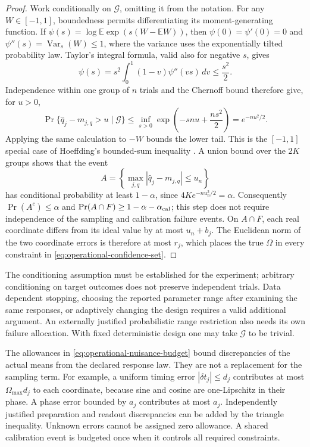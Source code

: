 \documentclass[11pt]{article}
\theoremstyle{definition}
\begin{document}
\begin{proof}
Work conditionally on $\mathcal G$, omitting it from the notation. For any
$W\in[-1,1]$, boundedness permits differentiating its moment-generating
function. If
$\psi(s)=\log\mathbb E\exp(s(W-\mathbb EW))$, then
$\psi(0)=\psi'(0)=0$ and
$\psi''(s)=\operatorname{Var}_s(W)\le1$, where the variance uses the
exponentially tilted probability law. Taylor's integral formula, valid also
for negative $s$, gives
\[
 \psi(s)=s^2\int_0^1(1-v)\psi''(vs)\,dv\le\frac{s^2}{2}.
\]
Independence within one group of $n$ trials and the Chernoff bound therefore
give, for $u>0$,
\[
 \Pr\{\widehat q_j-m_{j,q}>u\mid\mathcal G\}
 \le\inf_{s>0}\exp\left(-snu+\frac{ns^2}{2}\right)
 =e^{-nu^2/2}.
\]
Applying the same calculation to $-W$ bounds the lower tail. This is the
$[-1,1]$ special case of Hoeffding's bounded-sum inequality
\cite{hoeffding}. A union bound over the $2K$ groups shows that the event
\[
 A=\left\{\max_{j,q}|\widehat q_j-m_{j,q}|\le u_n\right\}
\]
has conditional probability at least $1-\alpha$, since
$4K e^{-nu_n^2/2}=\alpha$. Consequently $\Pr(A^c)\le\alpha$ and
$\Pr(A\cap F)\ge1-\alpha-\alpha_{\rm cal}$; this step does not require
independence of the sampling and calibration failure events. On $A\cap F$,
each real coordinate differs from its ideal value by at most $u_n+b_j$.
The Euclidean norm of the two coordinate errors is therefore at most $r_j$,
which places the true $\Omega$ in every constraint in
\eqref{eq:operational-confidence-set}.
\end{proof}

The conditioning assumption must be established for the experiment; arbitrary
conditioning on target outcomes does not preserve independent trials. Data
dependent stopping, choosing the reported parameter range after examining
the same responses, or adaptively changing the design requires a valid
additional argument. An externally justified probabilistic range restriction
also needs its own failure allocation. With fixed deterministic design one
may take $\mathcal G$ to be trivial.

The allowances in \eqref{eq:operational-nuisance-budget} bound discrepancies
of the actual means from the declared response law. They are not a replacement
for the sampling term. For example, a uniform timing error
$|\delta t_j|\le d_j$ contributes at most $\Omega_{\max}d_j$ to
each coordinate, because sine and cosine are one-Lipschitz in their phase.
A phase error bounded by $a_j$ contributes at most $a_j$. Independently
justified preparation and readout discrepancies can be added by the triangle
inequality. Unknown errors cannot be assigned zero allowance. A shared
calibration event is budgeted once when it controls all required constraints.
\end{document}

